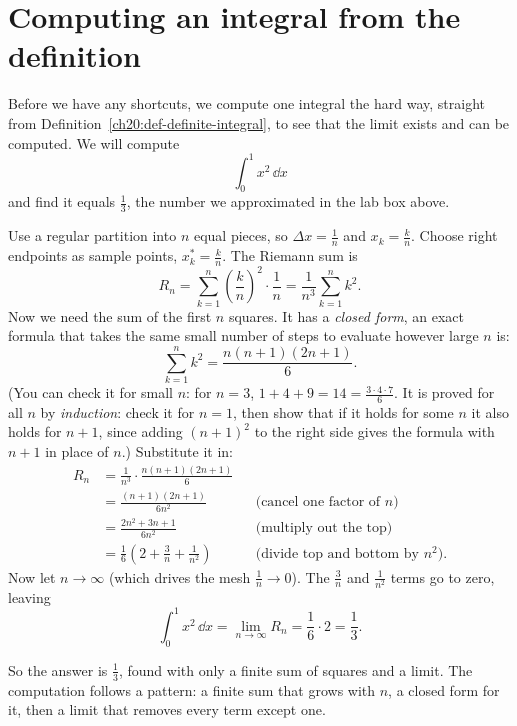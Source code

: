 \section{Computing an integral from the definition}
\label{ch20:from-def}

Before we have any shortcuts, we compute one integral the hard way, straight
from Definition~\ref{ch20:def-definite-integral}, to see that the limit
exists and can be computed. We will compute
\[
  \int_0^1 x^2 \, \dd x
\]
and find it equals $\tfrac13$, the number we approximated in the lab box above.

\begin{example}
\label{ch20:ex-x2}
Use a regular partition into $n$ equal pieces, so $\Delta x = \tfrac1n$ and
$x_k = \tfrac{k}{n}$. Choose right endpoints as sample points, $x_k^\ast =
\tfrac{k}{n}$. The Riemann sum is
\[
  R_n = \sum_{k=1}^{n} \left(\frac{k}{n}\right)^2 \cdot \frac{1}{n}
      = \frac{1}{n^3} \sum_{k=1}^{n} k^2.
\]
Now we need the sum of the first $n$ squares. It has a \emph{closed form}, an
exact formula that takes the same small number of steps to evaluate however
large $n$ is:
\[
  \sum_{k=1}^{n} k^2 = \frac{n(n+1)(2n+1)}{6}.
\]
(You can check it for small $n$: for $n=3$, $1+4+9=14=\tfrac{3\cdot4\cdot7}{6}$.
It is proved for all $n$ by \emph{induction}: check it for $n=1$, then show that
if it holds for some $n$ it also holds for $n+1$, since adding $(n+1)^2$ to
the right side gives the formula with $n+1$ in place of $n$.)
Substitute it in:
\begin{align*}
  R_n &= \frac{1}{n^3} \cdot \frac{n(n+1)(2n+1)}{6} \\
      &= \frac{(n+1)(2n+1)}{6n^2}
      && \text{(cancel one factor of $n$)} \\
      &= \frac{2n^2 + 3n + 1}{6n^2}
      && \text{(multiply out the top)} \\
      &= \frac{1}{6}\left(2 + \frac{3}{n} + \frac{1}{n^2}\right)
      && \text{(divide top and bottom by $n^2$)}.
\end{align*}
Now let $n \to \infty$ (which drives the mesh $\tfrac1n \to 0$). The
$\tfrac{3}{n}$ and $\tfrac{1}{n^2}$ terms go to zero, leaving
\[
  \int_0^1 x^2 \,\dd x = \lim_{n\to\infty} R_n
      = \frac{1}{6}\cdot 2 = \frac{1}{3}.
\]
\end{example}

So the answer is $\tfrac13$, found with only a finite sum of squares and a
limit. The computation follows a pattern: a finite sum that grows with $n$, a
closed form for it, then a limit that removes every term except one.

